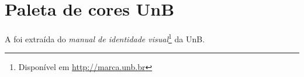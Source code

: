 \chapter{Paleta de cores UnB}\label{anx:coresunb}

A  foi extraída do \emph{manual de identidade visual}\footnote{Disponível em \url{http://marca.unb.br}} da UnB.

\cleardoublepage




\cleardoublepage